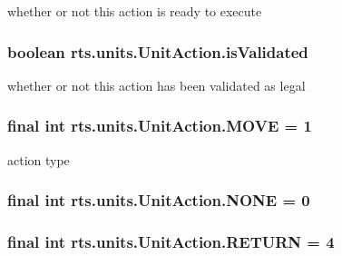 \label{classrts_1_1units_1_1_unit_action_a2bbb072721d535c656269075f6ce813d}
whether or not this action is ready to execute \hypertarget{classrts_1_1units_1_1_unit_action_a6a4db4f90844b5fc736c3935bdd266ff}{
\subsubsection[{isValidated}]{\setlength{\rightskip}{0pt plus 5cm}boolean {\bf rts.units.UnitAction.isValidated}}}
\label{classrts_1_1units_1_1_unit_action_a6a4db4f90844b5fc736c3935bdd266ff}
whether or not this action has been validated as legal \hypertarget{classrts_1_1units_1_1_unit_action_ae0c44a5741be60dc9e2d17bd7cbab0c3}{
\subsubsection[{MOVE}]{\setlength{\rightskip}{0pt plus 5cm}final int {\bf rts.units.UnitAction.MOVE} = 1}}
\label{classrts_1_1units_1_1_unit_action_ae0c44a5741be60dc9e2d17bd7cbab0c3}
action type \hypertarget{classrts_1_1units_1_1_unit_action_a0a91b5db9e5713ae6bc07d32efcae1b1}{
\subsubsection[{NONE}]{\setlength{\rightskip}{0pt plus 5cm}final int {\bf rts.units.UnitAction.NONE} = 0}}
\label{classrts_1_1units_1_1_unit_action_a0a91b5db9e5713ae6bc07d32efcae1b1}
\hypertarget{classrts_1_1units_1_1_unit_action_af700ddb351f336079eda218ec47a9e92}{
\subsubsection[{RETURN}]{\setlength{\rightskip}{0pt plus 5cm}final int {\bf rts.units.UnitAction.RETURN} = 4}}

